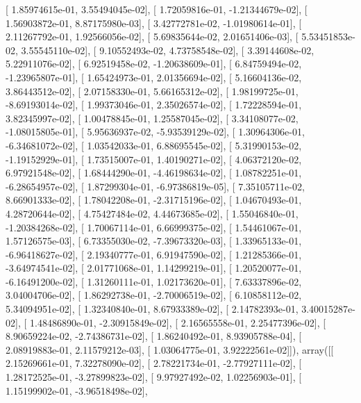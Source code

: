 \documentclass{article}
\begin{document}
       [  1.85974615e-01,   3.55494045e-02],
       [  1.72059816e-01,  -1.21344679e-02],
       [  1.56903872e-01,   8.87175980e-03],
       [  3.42772781e-02,  -1.01980614e-01],
       [  2.11267792e-01,   1.92566056e-02],
       [  5.69835644e-02,   2.01651406e-03],
       [  5.53451853e-02,   3.55545110e-02],
       [  9.10552493e-02,   4.73758548e-02],
       [  3.39144608e-02,   5.22911076e-02],
       [  6.92519458e-02,  -1.20638609e-01],
       [  6.84759494e-02,  -1.23965807e-01],
       [  1.65424973e-01,   2.01356694e-02],
       [  5.16604136e-02,   3.86443512e-02],
       [  2.07158330e-01,   5.66165312e-02],
       [  1.98199725e-01,  -8.69193014e-02],
       [  1.99373046e-01,   2.35026574e-02],
       [  1.72228594e-01,   3.82345997e-02],
       [  1.00478845e-01,   1.25587045e-02],
       [  3.34108077e-02,  -1.08015805e-01],
       [  5.95636937e-02,  -5.93539129e-02],
       [  1.30964306e-01,  -6.34681072e-02],
       [  1.03542033e-01,   6.88695545e-02],
       [  5.31990153e-02,  -1.19152929e-01],
       [  1.73515007e-01,   1.40190271e-02],
       [  4.06372120e-02,   6.97921548e-02],
       [  1.68444290e-01,  -4.46198634e-02],
       [  1.08782251e-01,  -6.28654957e-02],
       [  1.87299304e-01,  -6.97386819e-05],
       [  7.35105711e-02,   8.66901333e-02],
       [  1.78042208e-01,  -2.31715196e-02],
       [  1.04670493e-01,   4.28720644e-02],
       [  4.75427484e-02,   4.44673685e-02],
       [  1.55046840e-01,  -1.20384268e-02],
       [  1.70067114e-01,   6.66999375e-02],
       [  1.54461067e-01,   1.57126575e-03],
       [  6.73355030e-02,  -7.39673320e-03],
       [  1.33965133e-01,  -6.96418627e-02],
       [  2.19340777e-01,   6.91947590e-02],
       [  1.21285366e-01,  -3.64974541e-02],
       [  2.01771068e-01,   1.14299219e-01],
       [  1.20520077e-01,  -6.16491200e-02],
       [  1.31260111e-01,   1.02173620e-01],
       [  7.63337896e-02,   3.04004706e-02],
       [  1.86292738e-01,  -2.70006519e-02],
       [  6.10858112e-02,   5.34094951e-02],
       [  1.32340840e-01,   8.67933389e-02],
       [  2.14782393e-01,   3.40015287e-02],
       [  1.48486890e-01,  -2.30915849e-02],
       [  2.16565558e-01,   2.25477396e-02],
       [  8.90659224e-02,  -2.74386731e-02],
       [  1.86240492e-01,   8.93905788e-04],
       [  2.08919883e-01,   2.11579212e-03],
       [  1.03064775e-01,   3.92222561e-02]]), array([[  2.15269661e-01,   7.32278090e-02],
       [  2.78221734e-01,  -2.77927111e-02],
       [  1.28172525e-01,  -3.27899823e-02],
       [  9.97927492e-02,   1.02256903e-01],
       [  1.15199902e-01,  -3.96518498e-02],
\end{document}

